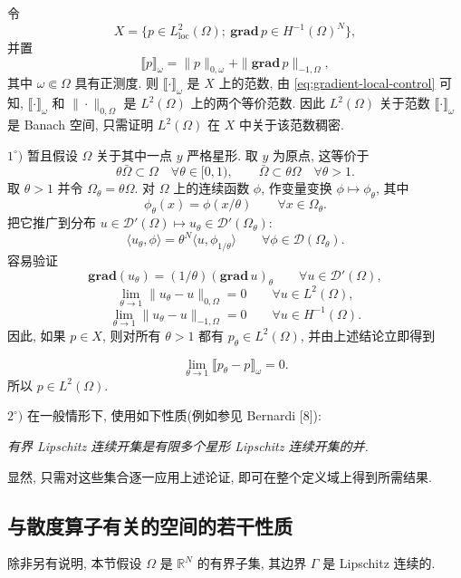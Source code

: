 \begin{Proof}
令
\[
X=\{p\in L^2_{\mathrm{loc}}(\Omega);\ \mathbf{grad}\,p\in H^{-1}(\Omega)^N\},
\]
并置
\[
\llbracket p\rrbracket_\omega=\|p\|_{0,\omega}+\|\mathbf{grad}\,p\|_{-1,\Omega},
\]
其中 $\omega\Subset\Omega$ 具有正测度. 则 $\llbracket\cdot\rrbracket_\omega$ 是 $X$ 上的范数,
由 \eqref{eq:gradient-local-control} 可知, $\llbracket\cdot\rrbracket_\omega$ 和
$\|\cdot\|_{0,\Omega}$ 是 $L^2(\Omega)$ 上的两个等价范数. 因此 $L^2(\Omega)$ 关于范数
$\llbracket\cdot\rrbracket_\omega$ 是 Banach 空间, 只需证明 $L^2(\Omega)$ 在 $X$ 中关于该范数稠密.

$1^\circ)$ 暂且假设 $\Omega$ 关于其中一点 $y$ 严格星形. 取 $y$ 为原点, 这等价于
\[
\theta\bar\Omega\subset\Omega\quad\forall\theta\in[0,1),
\qquad\bar\Omega\subset\theta\Omega\quad\forall\theta>1.
\]
取 $\theta>1$ 并令 $\Omega_\theta=\theta\Omega$. 对 $\Omega$ 上的连续函数 $\phi$,
作变量变换 $\phi\mapsto\phi_\theta$, 其中
\[
\phi_\theta(x)=\phi(x/\theta)\qquad\forall x\in\Omega_\theta.
\]
把它推广到分布 $u\in\mathcal D'(\Omega)\mapsto u_\theta\in\mathcal D'(\Omega_\theta)$:
\[
\langle u_\theta,\phi\rangle=\theta^N\langle u,\phi_{1/\theta}\rangle
\qquad\forall\phi\in\mathcal D(\Omega_\theta).
\]
容易验证
\[
\mathbf{grad}(u_\theta)=(1/\theta)(\mathbf{grad}\,u)_\theta
\qquad\forall u\in\mathcal D'(\Omega),
\]
\[
\lim_{\theta\to1}\|u_\theta-u\|_{0,\Omega}=0\qquad\forall u\in L^2(\Omega),
\]
\[
\lim_{\theta\to1}\|u_\theta-u\|_{-1,\Omega}=0\qquad\forall u\in H^{-1}(\Omega).
\]
因此, 如果 $p\in X$, 则对所有 $\theta>1$ 都有 $p_\theta\in L^2(\Omega)$, 并由上述结论立即得到

\[
\lim_{\theta\to1}\llbracket p_\theta-p\rrbracket_\omega=0.
\]
所以 $p\in L^2(\Omega)$.

$2^\circ)$ 在一般情形下, 使用如下性质(例如参见 Bernardi [8]):

\emph{有界 Lipschitz 连续开集是有限多个星形 Lipschitz 连续开集的并.}

显然, 只需对这些集合逐一应用上述论证, 即可在整个定义域上得到所需结果.
\end{Proof}

\setcounter{subsection}{1}
\subsection{与散度算子有关的空间的若干性质}\label{subsec:sec2-divergence-spaces}

除非另有说明, 本节假设 $\Omega$ 是 $\mathbb R^N$ 的有界子集, 其边界 $\Gamma$ 是 Lipschitz 连续的.

